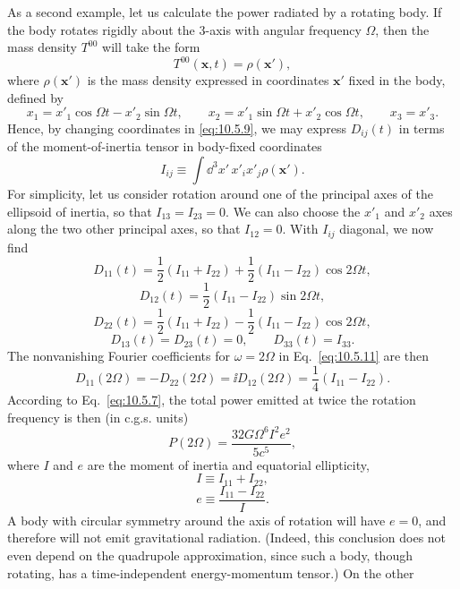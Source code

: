 As a second example, let us calculate the power radiated by a rotating body.
If the body rotates rigidly about the 3-axis with angular frequency
\(\Omega\), then the mass density \(T^{00}\) will take the form
\[
  T^{00}(\mathbf{x},t)=\rho(\mathbf{x}'),
\]
where \(\rho(\mathbf{x}')\) is the mass density expressed in coordinates
\(\mathbf{x}'\) fixed in the body, defined by
\[
  x_1=x'_1\cos\Omega t-x'_2\sin\Omega t,
  \qquad
  x_2=x'_1\sin\Omega t+x'_2\cos\Omega t,
  \qquad
  x_3=x'_3.
\]
Hence, by changing coordinates in \eqref{eq:10.5.9}, we may express
\(D_{ij}(t)\) in terms of the moment-of-inertia tensor in body-fixed
coordinates
\begin{equation}
  I_{ij}
  \equiv
  \int \dd^3x'\,x'_ix'_j\rho(\mathbf{x}').
  \tag{10.5.21}\label{eq:10.5.21}
\end{equation}
For simplicity, let us consider rotation around one of the principal axes of
the ellipsoid of inertia, so that \(I_{13}=I_{23}=0\). We can also choose
the \(x'_1\) and \(x'_2\) axes along the two other principal axes, so that
\(I_{12}=0\). With \(I_{ij}\) diagonal, we now find
\[
  D_{11}(t)
  =\frac12(I_{11}+I_{22})
  +\frac12(I_{11}-I_{22})\cos2\Omega t,
\]
\[
  D_{12}(t)=\frac12(I_{11}-I_{22})\sin2\Omega t,
\]
\[
  D_{22}(t)
  =\frac12(I_{11}+I_{22})
  -\frac12(I_{11}-I_{22})\cos2\Omega t,
\]
\[
  D_{13}(t)=D_{23}(t)=0,
  \qquad
  D_{33}(t)=I_{33}.
\]
The nonvanishing Fourier coefficients for \(\omega=2\Omega\) in
Eq.~\eqref{eq:10.5.11} are then
\[
  D_{11}(2\Omega)
  =
  -D_{22}(2\Omega)
  =
  \ii D_{12}(2\Omega)
  =
  \frac14(I_{11}-I_{22}).
\]
According to Eq.~\eqref{eq:10.5.7}, the total power emitted at twice the
rotation frequency is then (in c.g.s. units)
\begin{equation}
  P(2\Omega)
  =
  \frac{32G\Omega^6I^2e^2}{5c^5},
  \tag{10.5.22}\label{eq:10.5.22}
\end{equation}
where \(I\) and \(e\) are the moment of inertia and equatorial ellipticity,
\begin{equation}
  I\equiv I_{11}+I_{22},
  \tag{10.5.23}\label{eq:10.5.23}
\end{equation}
\begin{equation}
  e\equiv\frac{I_{11}-I_{22}}{I}.
  \tag{10.5.24}\label{eq:10.5.24}
\end{equation}
A body with circular symmetry around the axis of rotation will have \(e=0\),
and therefore will not emit gravitational radiation. (Indeed, this conclusion
does not even depend on the quadrupole approximation, since such a body,
though rotating, has a time-independent energy-momentum tensor.) On the other
